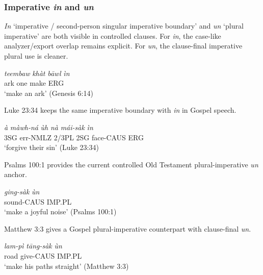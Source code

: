 \documentclass[
  11pt,
  a4paper,
]{article}
\newcommand{\tdim}[1]{\textit{#1}}
\newcommand{\tdimword}[1]{\textit{#1}}
\renewcommand{\textsc}[1]{{\footnotesize\MakeUppercase{#1}}}
\newcommand{\glossquote}[1]{`#1'}
\begin{document}
\subsubsection{\texorpdfstring{Imperative \tdim{in} and
\tdim{un}}{Imperative  and }}\label{imperative-and}

\tdim{In}
\glossquote{imperative / second-person singular imperative boundary} and
\tdim{un} \glossquote{plural imperative} are both visible in controlled
clauses. For \tdim{in}, the case-like analyzer/export overlap remains
explicit. For \tdim{un}, the clause-final imperative plural use is
cleaner.

\begin{exe}
\ex \label{ex:sfp-in-gen6-14}
\gll \tdimword{teembaw} \tdimword{khàt} \tdimword{bāwl} \tdimword{ìn} \\
     ark one make \textsc{erg} \\
\glt \glossquote{make an ark} (Genesis 6:14)
\end{exe}

Luke 23:34 keeps the same imperative boundary with \tdim{in} in Gospel
speech.

\begin{exe}
\ex \label{ex:sfp-in-luke23-34}
\gll \tdimword{à} \tdimword{màwh-ná} \tdimword{ùh} \tdimword{nà} \tdimword{mái-sàk} \tdimword{ìn} \\
     \textsc{3sg} err-\textsc{nmlz} 2/3PL \textsc{2sg} face-\textsc{caus} \textsc{erg} \\
\glt \glossquote{forgive their sin} (Luke 23:34)
\end{exe}

Psalms 100:1 provides the current controlled Old Testament
plural-imperative \tdim{un} anchor.

\begin{exe}
\ex \label{ex:sfp-un-ps100-1}
\gll \tdimword{ging-sàk} \tdimword{ùn} \\
     sound-\textsc{caus} \textsc{imp}.\textsc{pl} \\
\glt \glossquote{make a joyful noise} (Psalms 100:1)
\end{exe}

Matthew 3:3 gives a Gospel plural-imperative counterpart with
clause-final \tdim{un}.

\begin{exe}
\ex \label{ex:sfp-un-matt3-3}
\gll \tdimword{lam-pì} \tdimword{tāng-sàk} \tdimword{ùn} \\
     road give-\textsc{caus} \textsc{imp}.\textsc{pl} \\
\glt \glossquote{make his paths straight} (Matthew 3:3)
\end{exe}
\end{document}
